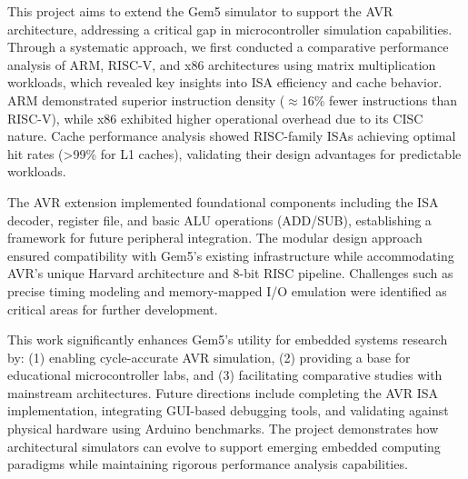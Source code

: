 This project aims to extend the Gem5 simulator to support the AVR architecture, addressing a critical gap in microcontroller simulation capabilities. Through a systematic approach, we first conducted a comparative performance analysis of ARM, RISC-V, and x86 architectures using matrix multiplication workloads, which revealed key insights into ISA efficiency and cache behavior. ARM demonstrated superior instruction density ($\approx$16\% fewer instructions than RISC-V), while x86 exhibited higher operational overhead due to its CISC nature. Cache performance analysis showed RISC-family ISAs achieving optimal hit rates (>99\% for L1 caches), validating their design advantages for predictable workloads.

The AVR extension implemented foundational components including the ISA decoder, register file, and basic ALU operations (ADD/SUB), establishing a framework for future peripheral integration. The modular design approach ensured compatibility with Gem5's existing infrastructure while accommodating AVR's unique Harvard architecture and 8-bit RISC pipeline. Challenges such as precise timing modeling and memory-mapped I/O emulation were identified as critical areas for further development.

This work significantly enhances Gem5's utility for embedded systems research by: (1) enabling cycle-accurate AVR simulation, (2) providing a base for educational microcontroller labs, and (3) facilitating comparative studies with mainstream architectures. Future directions include completing the AVR ISA implementation, integrating GUI-based debugging tools, and validating against physical hardware using Arduino benchmarks. The project demonstrates how architectural simulators can evolve to support emerging embedded computing paradigms while maintaining rigorous performance analysis capabilities.